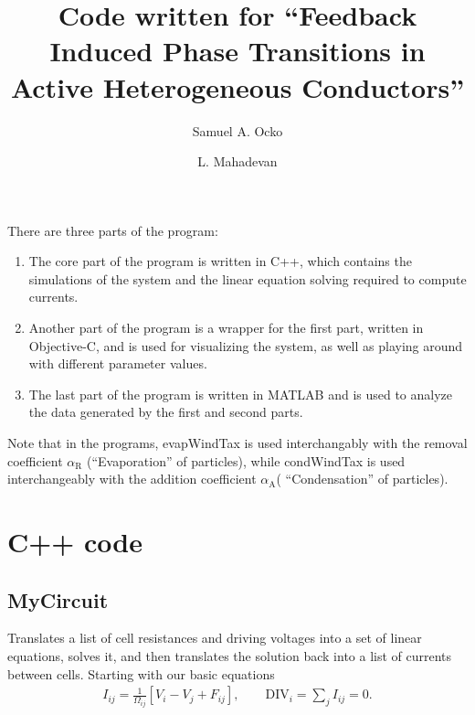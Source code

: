 \documentclass[rspublic, aps, superscriptaddress,preprintnumbers, showpacs, notitlepage]{revtex4-1}
\newcommand{\quotes}[1]{``#1''}
\newcommand{\bracket}[1]{{\left [ #1 \right ]}}
\newcommand{\myequationn}[1]{\begin{align*} #1 \end{align*}}
\def \resist{\ensuremath{\Omega} \xspace}
\def \curr{\ensuremath{I} \xspace}
\def \curr{\ensuremath{I} \xspace}
\def \div{\ensuremath{\text{DIV}} \xspace}
\def \voltage{\ensuremath{V}}
\def \driv{\ensuremath{F}}
\begin{document}


\title{
Code written for \quotes{Feedback Induced Phase Transitions in Active Heterogeneous Conductors}
}



\author{Samuel A. Ocko}
\author{L. Mahadevan}

\maketitle



There are three parts of the program:

\begin{enumerate}
\item
The core part of the program is written in C++, which contains the simulations of the system and the linear equation solving required to compute currents. 
\item
Another part of the program is a wrapper for the first part, written in Objective-C, and is used for visualizing the system, as well as playing around with different parameter values.
\item The last part of the program is written in MATLAB and is used to analyze the data generated by the first and second parts. 
\end{enumerate}

Note that in the programs, evapWindTax is used interchangably with the removal coefficient $\alpha_{\text{R}}$ (\quotes{Evaporation} of particles), while condWindTax is used interchangeably with the addition coefficient $\alpha_{\text{A}}$( \quotes{Condensation} of particles).


\section{C++ code}

\subsection{MyCircuit}
Translates a list of cell resistances and driving voltages into a set of linear equations, solves it, and then translates the solution back into a list of currents between cells. Starting with our basic equations
\myequationn{
\curr_{ij} = \frac{1}{\resist_{ij}} \bracket{\voltage_{i} - \voltage_{j} + \driv_{ij}}, \qquad \div_{i} = \sum_{j} \curr_{ij} = 0. 
}
\end{document}
